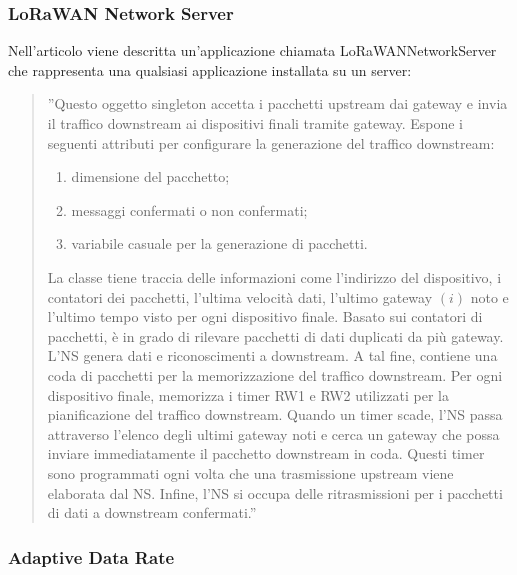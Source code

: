 \documentclass[a4paper]{report} %
\begin{document}
\subsubsection{LoRaWAN Network Server}
Nell'articolo \cite{art:rif.49} viene descritta un'applicazione chiamata LoRaWANNetworkServer che rappresenta una qualsiasi applicazione installata su un server:
\begin{quote}
	''Questo oggetto singleton accetta i pacchetti upstream dai gateway e invia il traffico downstream ai dispositivi finali tramite gateway. Espone i seguenti attributi per configurare la generazione del traffico downstream:
	\begin{enumerate}
		\item dimensione del pacchetto;
		\item messaggi confermati o non confermati;
		\item variabile casuale per la generazione di pacchetti.
	\end{enumerate}
	La classe tiene traccia delle informazioni come l'indirizzo del dispositivo, i contatori dei pacchetti, l'ultima velocità dati, l'ultimo gateway $(i)$ noto e l'ultimo tempo visto per ogni dispositivo finale. Basato sui contatori di pacchetti, è in grado di rilevare pacchetti di dati duplicati da più gateway. L'NS genera dati e riconoscimenti a downstream. A tal fine, contiene una coda di pacchetti per la memorizzazione del traffico downstream. Per ogni dispositivo finale, memorizza i timer RW1 e RW2 utilizzati per la pianificazione del traffico downstream. Quando un timer scade, l'NS passa attraverso l'elenco degli ultimi gateway noti e cerca un gateway che possa inviare immediatamente il pacchetto downstream in coda. Questi timer sono programmati ogni volta che una trasmissione upstream viene elaborata dal NS. Infine, l'NS si occupa delle ritrasmissioni per i pacchetti di dati a downstream confermati.''
\end{quote}

\subsubsection{Adaptive Data Rate}
\end{document}
